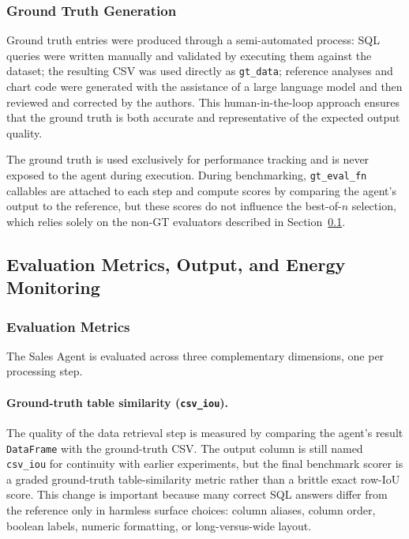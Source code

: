 \subsubsection{Ground Truth Generation}

Ground truth entries were produced through a semi-automated process: SQL queries
were written manually and validated by executing them against the dataset; the
resulting CSV was used directly as \texttt{gt\_data}; reference analyses and chart
code were generated with the assistance of a large language model and then reviewed
and corrected by the authors. This human-in-the-loop approach ensures that the
ground truth is both accurate and representative of the expected output quality.

The ground truth is used exclusively for performance tracking and is never exposed
to the agent during execution. During benchmarking, \texttt{gt\_eval\_fn} callables
are attached to each step and compute scores by comparing the agent's output to the
reference, but these scores do not influence the best-of-$n$ selection, which relies
solely on the non-GT evaluators described in Section~\ref{subsec:evaluation}.

\subsection{Evaluation Metrics, Output, and Energy Monitoring}
\label{subsec:evaluation}

\subsubsection{Evaluation Metrics}

The Sales Agent is evaluated across three complementary dimensions, one per
processing step.

\paragraph{Ground-truth table similarity (\texttt{csv\_iou}).}
The quality of the data retrieval step is measured by comparing the agent's
result \texttt{DataFrame} with the ground-truth CSV. The output column is still
named \texttt{csv\_iou} for continuity with earlier experiments, but the final
benchmark scorer is a graded ground-truth table-similarity metric rather than a
brittle exact row-IoU score. This change is important because many correct SQL
answers differ from the reference only in harmless surface choices: column
aliases, column order, boolean labels, numeric formatting, or long-versus-wide
layout.

